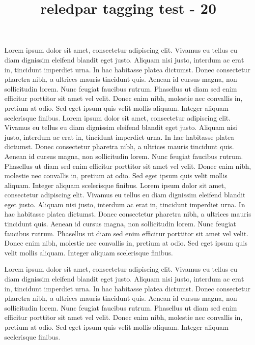 \documentclass{article}
\title{reledpar tagging test - 20}
\begin{document}
\begin{pages}
\begin{Rightside}
\beginnumbering
\pstart
Lorem ipsum dolor sit amet, consectetur adipiscing elit. Vivamus eu tellus eu diam dignissim eleifend blandit eget justo. Aliquam nisi justo, interdum ac erat in, tincidunt imperdiet urna. In hac habitasse platea dictumst. Donec consectetur pharetra nibh, a ultrices mauris tincidunt quis. Aenean id cursus magna, non sollicitudin lorem. Nunc feugiat faucibus rutrum. Phasellus ut diam sed enim efficitur porttitor sit amet vel velit. Donec enim nibh, molestie nec convallis in, pretium at odio. Sed eget ipsum quis velit mollis aliquam. Integer aliquam scelerisque finibus.
\pend
\pstart
Lorem ipsum dolor sit amet, consectetur adipiscing elit. Vivamus eu tellus eu diam dignissim eleifend blandit eget justo. Aliquam nisi justo, interdum ac erat in, tincidunt imperdiet urna. In hac habitasse platea dictumst. Donec consectetur pharetra nibh, a ultrices mauris tincidunt quis. Aenean id cursus magna, non sollicitudin lorem. Nunc feugiat faucibus rutrum. Phasellus ut diam sed enim efficitur porttitor sit amet vel velit. Donec enim nibh, molestie nec convallis in, pretium at odio. Sed eget ipsum quis velit mollis aliquam. Integer aliquam scelerisque finibus.
\pend
\pstart
Lorem ipsum dolor sit amet, consectetur adipiscing elit. Vivamus eu tellus eu diam dignissim eleifend blandit eget justo. Aliquam nisi justo, interdum ac erat in, tincidunt imperdiet urna. In hac habitasse platea dictumst. Donec consectetur pharetra nibh, a ultrices mauris tincidunt quis. Aenean id cursus magna, non sollicitudin lorem. Nunc feugiat faucibus rutrum. Phasellus ut diam sed enim efficitur porttitor sit amet vel velit. Donec enim nibh, molestie nec convallis in, pretium at odio. Sed eget ipsum quis velit mollis aliquam. Integer aliquam scelerisque finibus.
\pend[\relax]
\endnumbering
\end{Rightside}
\begin{Leftside}
\beginnumbering
\pstart
Lorem ipsum dolor sit amet, consectetur adipiscing elit. Vivamus eu tellus eu diam dignissim eleifend blandit eget justo. Aliquam nisi justo, interdum ac erat in, tincidunt imperdiet urna. In hac habitasse platea dictumst. Donec consectetur pharetra nibh, a ultrices mauris tincidunt quis. Aenean id cursus magna, non sollicitudin lorem. Nunc feugiat faucibus rutrum. Phasellus ut diam sed enim efficitur porttitor sit amet vel velit. Donec enim nibh, molestie nec convallis in, pretium at odio. Sed eget ipsum quis velit mollis aliquam. Integer aliquam scelerisque finibus.

\end{Leftside}
\end{pages}
\end{document}
